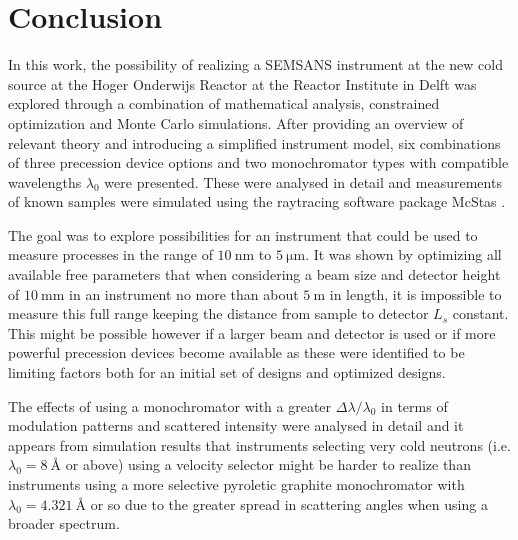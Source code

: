 \chapter{Conclusion}
\label{chapter:conclusion}
\label{c7:conclusion}
In this work, the possibility of realizing a SEMSANS instrument at the new cold source at the Hoger Onderwijs Reactor at the Reactor Institute in Delft was explored through a combination of mathematical analysis, constrained optimization and Monte Carlo simulations. After providing an overview of relevant theory and introducing a simplified instrument model, six combinations of three precession device options and two monochromator types with compatible wavelengths $\lambda_0$ were presented. These were analysed in detail and measurements of known samples were simulated using the raytracing software package McStas \cite{willendrup2020}. 

The goal was to explore possibilities for an instrument that could be used to measure processes in the range of $\SI{10}{\nano\meter}$ to $\SI{5}{\micro\meter}$. It was shown by optimizing all available free parameters that when considering a beam size and detector height of $\SI{10}{\milli\meter}$ in an instrument no more than about $\SI{5}{\meter}$ in length, it is impossible to measure this full range keeping the distance from sample to detector $L_s$ constant. This might be possible however if a larger beam and detector is used or if more powerful precession devices become available as these were identified to be limiting factors both for an initial set of designs and optimized designs.

The effects of using a monochromator with a greater $\Delta\lambda/\lambda_0$ in terms of modulation patterns and scattered intensity were analysed in detail and it appears from simulation results that instruments selecting very cold neutrons (i.e. $\lambda_0 = \SI{8}{\angstrom}$ or above) using a velocity selector might be harder to realize than instruments using a more selective pyroletic graphite monochromator with $\lambda_0 = \SI{4.321}{\angstrom}$ or so due to the greater spread in scattering angles when using a broader spectrum. 

